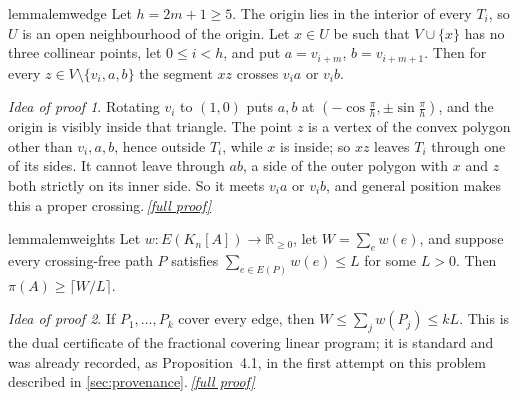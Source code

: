 \documentclass[11pt,a4paper]{article}
\theoremstyle{plain}
\theoremstyle{definition}
\theoremstyle{remark}
\newtheorem*{proofidea}{Idea of proof}
\newcommand{\fullproofref}[1]{\,\hyperref[#1]{\textit{[full proof]}}}
\newcommand{\R}{\mathbb R}
\newcommand{\pipath}{\pi}
\begin{document}
\begin{restatable}[Wedge]{lemma}{lemwedge}\label{lem:wedge}
Let $h=2m+1\ge5$. The origin lies in the interior of every $T_i$, so $U$ is an open neighbourhood of the origin. Let $x\in U$ be such that $V\cup\{x\}$ has no three collinear points, let $0\le i<h$, and put $a=v_{i+m}$, $b=v_{i+m+1}$. Then for every $z\in V\setminus\{v_i,a,b\}$ the segment $xz$ crosses $v_ia$ or $v_ib$.
\end{restatable}
\begin{proofidea}
Rotating $v_i$ to $(1,0)$ puts $a,b$ at $(-\cos\frac\pi h,\pm\sin\frac\pi h)$, and the origin is visibly inside that triangle. The point $z$ is a vertex of the convex polygon other than $v_i,a,b$, hence outside $T_i$, while $x$ is inside; so $xz$ leaves $T_i$ through one of its sides. It cannot leave through $ab$, a side of the outer polygon with $x$ and $z$ both strictly on its inner side. So it meets $v_ia$ or $v_ib$, and general position makes this a proper crossing.\fullproofref{pf:wedge}
\end{proofidea}

\begin{restatable}{lemma}{lemweights}\label{lem:weights}
Let $w\colon E(K_n[A])\to\R_{\ge0}$, let $W=\sum_e w(e)$, and suppose every crossing-free path $P$ satisfies $\sum_{e\in E(P)}w(e)\le L$ for some $L>0$. Then $\pipath(A)\ge\lceil W/L\rceil$.
\end{restatable}
\begin{proofidea}
If $P_1,\dots,P_k$ cover every edge, then $W\le\sum_j w(P_j)\le kL$. This is the dual certificate of the fractional covering linear program; it is standard and was already recorded, as Proposition~4.1, in the first attempt on this problem described in \cref{sec:provenance}.\fullproofref{pf:weights}
\end{proofidea}
\end{document}

